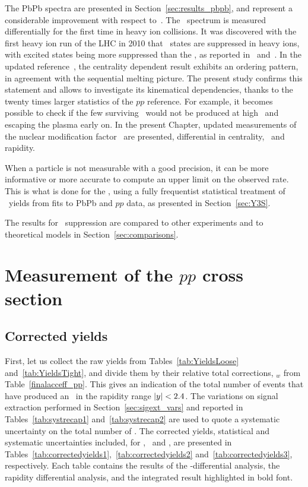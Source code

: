 The PbPb spectra are presented in Section~\ref{sec:results_pbpb}, and represent a considerable
improvement with respect to~\cite{torsten}. The \PgUb\ spectrum is
 measured differentially for the first time in heavy ion collisions. It was discovered with the first heavy ion run of the
LHC in 2010 that \PgU\ states are suppressed in heavy ions, with
excited states being more suppressed than the \PgUa, as reported
in~\cite{torsten} and~\cite{HIN-11-007}. In the updated reference~\cite{11-011},
the centrality dependent result exhibits an ordering pattern, in
agreement with the sequential melting picture. 
The present study confirms this statement and allows to investigate its kinematical dependencies, thanks to the
twenty times larger statistics of the $pp$ reference. For example, it
becomes possible to check if the few surviving \PgUb\ would not be produced at high
\pt\ and escaping the plasma early on.  In the present Chapter,
updated measurements of the nuclear modification factor \RAA\ are
presented, differential in centrality, \pt\ and rapidity.%

When a particle is not measurable with a good precision,
it can be more informative or more accurate to compute an upper limit
on the observed rate. This is what is done for the \PgUc, using a
fully frequentist statistical treatment of \PgUc\ yields from fits to
PbPb and $pp$ data, as presented in Section~\ref{sec:Y3S}. 

The results for \PgU\ suppression are compared to other experiments
and to theoretical models in Section~\ref{sec:comparisons}.

\section{Measurement of the  \texorpdfstring{$pp$}{pp} cross section}
\label{sec:results_pp}
\subsection{Corrected yields}

First, let us collect the raw yields from Tables~\ref{tab:YieldsLoose} and~\ref{tab:YieldsTight}, and divide them
by their relative total corrections, \acc\eff$_{w}$ from Table~\ref{finalacceff_pp}. This 
gives an indication of the total number of events that have produced an \PgU\ in the rapidity range
$\vert y\vert < 2.4$. The variations on signal extraction performed in Section~\ref{sec:sigext_vars} and reported in Tables~\ref{tab:systrecap1}
and~\ref{tab:systrecap2} are used to quote a systematic uncertainty on the total
number of \PgU. The corrected yields, statistical
and systematic uncertainties included, for \PgUa, \PgUb\ and \PgUc,
are presented in
Tables~\ref{tab:correctedyields1},~\ref{tab:correctedyields2}
and~\ref{tab:correctedyields3}, respectively. Each table contains the
results of the \pt-differential analysis, the rapidity differential
analysis, and the integrated result highlighted in bold font.

